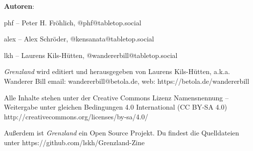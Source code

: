 \documentclass[11pt]{wbzine}
\begin{document}
\textbf{Autoren}:

phf -- Peter H. Fröhlich, @phf@tabletop.social

alex -- Alex Schröder, @kensanata@tabletop.social 

lkh -- Laurens Kils-Hütten, @wandererbill@tabletop.social 

\textit{Grenzland} wird editiert und
herausgegeben von Laurens Kils-Hütten,
a.k.a. Wanderer Bill
email: wandererbill@betola.de, web: https://betola.de/wandererbill

Alle Inhalte stehen unter der Creative Commons Lizenz
Namensnennung -- Weitergabe unter gleichen Bedingungen 4.0 International (CC BY-SA 4.0)\\
http://creativecommons.org/licenses/by-sa/4.0/

Außerdem ist \textit{Grenzland} ein Open Source Projekt. Du
findest die Quelldateien unter 
https://github.com/lskh/Grenzland-Zine

\end{document}
